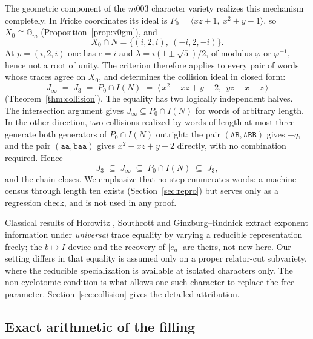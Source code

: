 \documentclass[11pt,a4paper]{article}
\theoremstyle{definition}
\theoremstyle{remark}
\begin{document}
The geometric component of the $m003$ character variety realizes this
mechanism completely. In Fricke coordinates its ideal is
$P_0 = \langle xz+1,\ x^2+y-1\rangle$, so $X_0 \cong \mathbb{G}_m$
(Proposition~\ref{prop:x0gm}), and
\begin{equation}
X_0 \cap N = \{(i,2,i),\ (-i,2,-i)\}.
\end{equation}
At $p = (i,2,i)$ one has $c = i$ and $\lambda = i(1 \pm \sqrt5)/2$, of
modulus $\varphi$ or $\varphi^{-1}$, hence not a root of unity. The
criterion therefore applies to every pair of words whose traces agree on
$X_0$, and determines the collision ideal in closed form:
\begin{equation}
\boxed{\;
J_\infty \;=\; J_3 \;=\; P_0 \cap I(N)
\;=\; \langle\, x^2 - xz + y - 2,\ \ yz - x - z \,\rangle
\;}
\end{equation}
(Theorem~\ref{thm:collision}). The equality has two logically independent
halves. The intersection argument gives
$J_\infty \subseteq P_0 \cap I(N)$ for words of arbitrary length. In the
other direction, two collisions realized by words of length at most three
generate both generators of $P_0 \cap I(N)$ outright: the pair
$(\mathtt{AB},\mathtt{ABB})$ gives $-q$, and the pair
$(\mathtt{aa},\mathtt{baa})$ gives $x^2 - xz + y - 2$ directly, with no
combination required. Hence
\begin{equation}
J_3 \;\subseteq\; J_\infty \;\subseteq\; P_0 \cap I(N) \;\subseteq\; J_3 ,
\end{equation}
and the chain closes. We emphasize that no step enumerates words: a
machine census through length ten exists (Section~\ref{sec:repro}) but
serves only as a regression check, and is not used in any proof.

Classical results of Horowitz \cite{Horowitz1972}, Southcott
\cite{Southcott1979} and Ginzburg--Rudnick \cite{GinzburgRudnick1998}
extract exponent information under \emph{universal} trace equality by
varying a reducible representation freely; the $b \mapsto I$ device and the
recovery of $|e_a|$ are theirs, not new here. Our setting differs in that
equality is assumed only on a proper relator-cut subvariety, where the
reducible specialization is available at isolated characters only. The
non-cyclotomic condition is what allows one such character to replace the
free parameter. Section~\ref{sec:collision} gives the detailed
attribution.

\subsection{Exact arithmetic of the filling}
\end{document}
